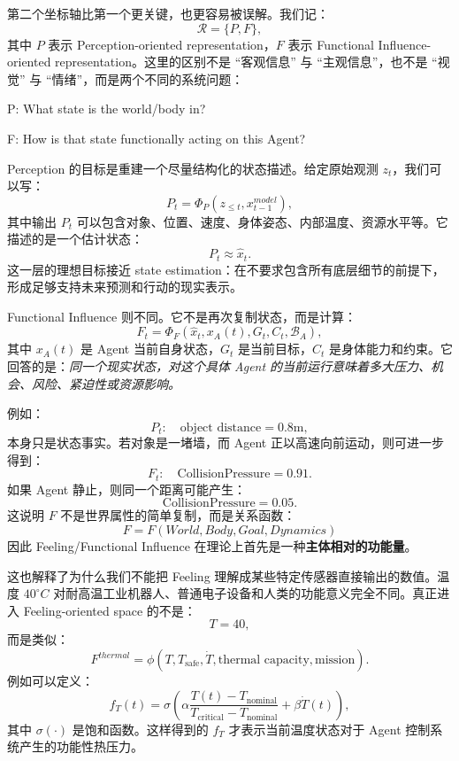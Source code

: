 第二个坐标轴比第一个更关键，也更容易被误解。我们记：
\[
\mathcal R
=
\{P,F\},
\]
其中 $P$ 表示 Perception-oriented representation，$F$ 表示 Functional Influence-oriented representation。这里的区别不是 ``客观信息'' 与 ``主观信息''，也不是 ``视觉'' 与 ``情绪''，而是两个不同的系统问题：

\begin{statementbox}
P: What state is the world/body in?
\end{statementbox}

\begin{statementbox}
F: How is that state functionally acting on this Agent?
\end{statementbox}

Perception 的目标是重建一个尽量结构化的状态描述。给定原始观测 $z_t$，我们可以写：
\[
P_t
=
\Phi_P(z_{\leq t},x_{t-1}^{model}),
\]
其中输出 $P_t$ 可以包含对象、位置、速度、身体姿态、内部温度、资源水平等。它描述的是一个估计状态：
\[
P_t
\approx
\hat{x}_t.
\]
这一层的理想目标接近 state estimation：在不要求包含所有底层细节的前提下，形成足够支持未来预测和行动的现实表示。

Functional Influence 则不同。它不是再次复制状态，而是计算：
\[
F_t
=
\Phi_F(
\hat{x}_t,
x_A(t),
G_t,
C_t,
\mathcal B_A
),
\]
其中 $x_A(t)$ 是 Agent 当前自身状态，$G_t$ 是当前目标，$C_t$ 是身体能力和约束。它回答的是：\emph{同一个现实状态，对这个具体 Agent 的当前运行意味着多大压力、机会、风险、紧迫性或资源影响。}

例如：
\[
P_t:
\quad
\text{object distance}=0.8\mathrm{m},
\]
本身只是状态事实。若对象是一堵墙，而 Agent 正以高速向前运动，则可进一步得到：
\[
F_t:
\quad
\mathrm{CollisionPressure}=0.91.
\]
如果 Agent 静止，则同一个距离可能产生：
\[
\mathrm{CollisionPressure}=0.05.
\]
这说明 $F$ 不是世界属性的简单复制，而是关系函数：
\[
\boxed{
F
=
F(World,Body,Goal,Dynamics)
}
\]
因此 Feeling/Functional Influence 在理论上首先是一种\textbf{主体相对的功能量}。

这也解释了为什么我们不能把 Feeling 理解成某些特定传感器直接输出的数值。温度 $40^\circ C$ 对耐高温工业机器人、普通电子设备和人类的功能意义完全不同。真正进入 Feeling-oriented space 的不是：
\[
T=40,
\]
而是类似：
\[
F^{thermal}
=
\phi(
T,
T_{\mathrm{safe}},
\dot{T},
\text{thermal capacity},
\text{mission}
).
\]
例如可以定义：
\[
f_T(t)
=
\sigma
\left(
\alpha
\frac{T(t)-T_{\mathrm{nominal}}}
{T_{\mathrm{critical}}-T_{\mathrm{nominal}}}
+
\beta\dot{T}(t)
\right),
\]
其中 $\sigma(\cdot)$ 是饱和函数。这样得到的 $f_T$ 才表示当前温度状态对于 Agent 控制系统产生的功能性热压力。

